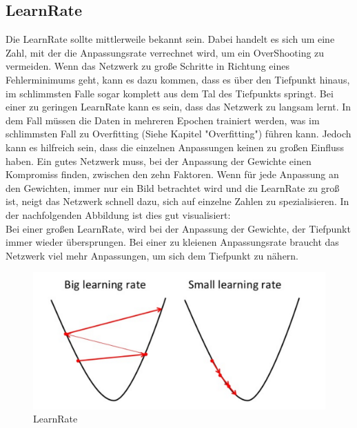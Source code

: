 \documentclass[12pt]{article}
\begin{document}
\subsection{LearnRate}
Die LearnRate sollte mittlerweile bekannt sein. Dabei handelt es sich um eine Zahl, mit der die Anpassungsrate verrechnet wird, um ein OverShooting zu vermeiden. Wenn das Netzwerk zu große Schritte in Richtung eines Fehlerminimums geht, kann es dazu kommen, dass es über den Tiefpunkt hinaus, im schlimmsten Falle sogar komplett aus dem Tal des Tiefpunkts springt. Bei einer zu geringen LearnRate kann es sein, dass das Netzwerk zu langsam lernt. In dem Fall müssen die Daten in mehreren Epochen trainiert werden, was im schlimmsten Fall zu Overfitting (Siehe Kapitel "Overfitting") führen kann. Jedoch kann es hilfreich sein, dass die einzelnen Anpassungen keinen zu großen Einfluss haben. Ein gutes Netzwerk muss, bei der Anpassung der Gewichte einen Kompromiss finden, zwischen den zehn Faktoren. Wenn für jede Anpassung an den Gewichten, immer nur ein Bild betrachtet wird und die LearnRate zu groß ist, neigt das Netzwerk schnell dazu, sich auf einzelne Zahlen zu spezialisieren. In der nachfolgenden Abbildung ist dies gut visualisiert:\\
Bei einer großen LearnRate, wird bei der Anpassung der Gewichte, der Tiefpunkt immer wieder übersprungen. Bei einer zu kleienen Anpassungsrate braucht das Netzwerk viel mehr Anpassungen, um sich dem Tiefpunkt zu nähern.
\begin{figure}[H]
\centering
\includegraphics[scale=0.250]{./Images/Pasted image 20230917181526.png}
\caption{LearnRate}
\label{LearnRate}
\end{figure}
\end{document}
